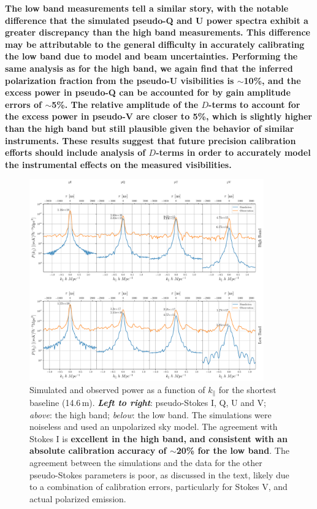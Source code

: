 \documentclass[twocolumn, trackchanges]{aastex61}
\newcommand{\edited}[1]{{\bf \color{blue} #1}}
\begin{document}
\edited{The low band measurements tell a similar story, with the notable
  difference that the simulated pseudo-Q and U power spectra exhibit a greater
  discrepancy than the high band measurements.  This difference may be attributable to the general difficulty in accurately calibrating the low band due to model and beam uncertainties.
  Performing the same analysis as for the high band, we
  again find that the inferred polarization fraction from the pseudo-U
  visibilities is $\sim$10\%, and the excess power in pseudo-Q can be accounted
  for by gain amplitude errors of $\sim$5\%. The relative amplitude of the
  $D$-terms to account for the excess power in pseudo-V are closer to 5\%, which
  is slightly higher than the high band but still plausible given the behavior
  of similar instruments. These results suggest that future precision
  calibration efforts should include analysis of $D$-terms in order to
  accurately model the instrumental effects on the measured visibilities.}

\begin{figure}[h]
\centering
\includegraphics[width=0.9\textwidth]{real_sim_compare_noinset.pdf}
\caption{Simulated and observed power as a function of $k_{\parallel}$ for the
  shortest baseline (14.6\,m). \edited{\textit{Left to right}}: pseudo-Stokes I,
  Q, U and V; \textit{above}: the high band; \textit{below}: the low band. The
  simulations were noiseless and used an unpolarized sky model. The agreement
  with Stokes I is \edited{excellent in the high band, and consistent with an
    absolute calibration accuracy of $\sim$20\% for the low band}.  The
  agreement between the simulations and the data for the other pseudo-Stokes
  parameters is poor, as discussed in the text, likely due to a combination of
  calibration errors, particularly for Stokes V, and actual polarized emission.}
\label{fig:bl0_cuts_vs_sim}
\end{figure}
\end{document}
